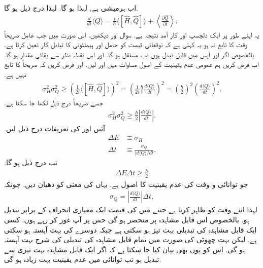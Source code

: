 اب  ہرمیشی ہے, لہذا  ہو گا. لہذا درج ذیل ہو گا.
\begin{align}
\frac{d}{dt} \langle Q \rangle = \frac{i}{\hbar} \langle [ \hat{H} , \hat{Q} ] \rangle + \left\langle \frac{\partial \hat{Q}}{\partial t} \right\rangle .
\end{align}
یہ اپنے طور پر ایک دلچسپ اور کار آمد نتیجہ ہے. سوال  اور  دیکھیں. اس صورت میں جب عامل صریحاً وقت کا تابع نہ ہو یہ کہتی ہے کہ توقعاتی قیمت کو حامل اور ہیملٹونی کا تبادل کار تعین کرتا ہے. بالخصوص اگر  اور {  آپس میں قابل تبدل ہوں تب  مستقل ہو گا. اور اس نقطہ نظر سے  بقائی مقدار ہو گا.
اب فرض کریں ہم عمومی عدم یقینیت کے اصول مساوات  میں  اور  لیں. اور فرض کریں کہ  صریحاً  کا تابع نہیں ہے.
\begin{align*}
\sigma_{H}^{2} \sigma_{Q}^{2} \geq \left( \frac{1}{2i} \langle [ \hat{H}, \hat{Q} ] \rangle \right)^{2} = \left( \frac{1}{2i} \frac{\hbar}{i} \frac{d \langle Q \rangle}{dt} \right)^{2} = \left( \frac{\hbar}{2} \right)^{2} \left( \frac{d \langle Q \rangle}{dt} \right)^{2} .
\end{align*}
جسے صریحاً درج ذیل لکھا جا سکتا ہے. 
\begin{align*}
\sigma_{H}^{2} \sigma_{Q}^{2} \geq \frac{\hbar}{2} \left| \frac{d\langle Q \rangle}{dt} \right| .
\end{align*}
آئیں  اور  کی تعریفات درج ذیل لیں. 
\begin{align}
\Delta E &\equiv \sigma_{H} \\
\Delta t &\equiv \frac{\sigma_{Q}}{|d\langle Q \rangle / dt} .
\end{align}
تب درج ذیل ہو گا. 
\begin{align}
\Delta E \Delta t \geq \frac{\hbar}{2}
\end{align}
جو توانائی و وقت کی عدم یقینیت کا اصول ہے. یہاں  کی معنی کو دھیان دیں. چونکہ 
\begin{align*}
\sigma_{Q} = \left| \frac{d \langle Q \rangle}{dt} \right| \Delta t ,
\end{align*}
لہذا  اتنے وقت کو ظاہر کرتا ہے جتنے میں  کی قیمت ایک معیاری انحراف کے برابر تبدیل ہو. بالخصوص  اس قابل مشاہدہ  پر منحصر ہو گی حس پر آپ غور کر رہے ہوں. کسی ایک قابل مشاہدہ کی تبدیلی بہت تیز ہو سکتی ہے جبکہ دوسرے کی بہت آہستہ ہو سکتی ہے. لیکن بہت چھوٹی  کی صورت میں تمام قابل مشاہدہ کی تبدیلی کی شرح بہت آہستہ ہو گی. اس کو یوں بھی بیان کیا جا سکتا ہے کہ اگر ایک قابل مشاہدہ بہت تیزی سے تبدیل ہو تب توانائی میں عدم یقینیت بہت زیادہ ہو گی.
}

